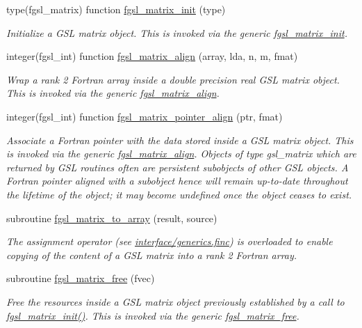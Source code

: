 \begin{DoxyCompactItemize}
type(fgsl\+\_\+matrix) function \hyperlink{array_8finc_af93d762ccde0b58b767c72579cbfb3cb}{fgsl\+\_\+matrix\+\_\+init} (type)
\begin{DoxyCompactList}\small\item\em Initialize a G\+S\+L matrix object. This is invoked via the generic \hyperlink{interfacefgsl__matrix__init}{fgsl\+\_\+matrix\+\_\+init}. \end{DoxyCompactList}\item 
integer(fgsl\+\_\+int) function \hyperlink{array_8finc_ae0c19c4453ce18db5e6415a047c3a59e}{fgsl\+\_\+matrix\+\_\+align} (array, lda, n, m, fmat)
\begin{DoxyCompactList}\small\item\em Wrap a rank 2 Fortran array inside a double precision real G\+S\+L matrix object. This is invoked via the generic \hyperlink{interfacefgsl__matrix__align}{fgsl\+\_\+matrix\+\_\+align}. \end{DoxyCompactList}\item 
integer(fgsl\+\_\+int) function \hyperlink{array_8finc_a54b17f056b272b74ae425a588e4653d5}{fgsl\+\_\+matrix\+\_\+pointer\+\_\+align} (ptr, fmat)
\begin{DoxyCompactList}\small\item\em Associate a Fortran pointer with the data stored inside a G\+S\+L matrix object. This is invoked via the generic \hyperlink{interfacefgsl__matrix__align}{fgsl\+\_\+matrix\+\_\+align}. Objects of type {\ttfamily gsl\+\_\+matrix} which are returned by G\+S\+L routines often are persistent subobjects of other G\+S\+L objects. A Fortran pointer aligned with a subobject hence will remain up-\/to-\/date throughout the lifetime of the object; it may become undefined once the object ceases to exist. \end{DoxyCompactList}\item 
subroutine \hyperlink{array_8finc_a44e06325d8b322997dcf6ab28417dd4f}{fgsl\+\_\+matrix\+\_\+to\+\_\+array} (result, source)
\begin{DoxyCompactList}\small\item\em The assignment operator (see \hyperlink{generics_8finc}{interface/generics.\+finc}) is overloaded to enable copying of the content of a G\+S\+L matrix into a rank 2 Fortran array. \end{DoxyCompactList}\item 
subroutine \hyperlink{array_8finc_a0b551f436f076593a8a828cd266e372d}{fgsl\+\_\+matrix\+\_\+free} (fvec)
\begin{DoxyCompactList}\small\item\em Free the resources inside a G\+S\+L matrix object previously established by a call to \hyperlink{array_8finc_af93d762ccde0b58b767c72579cbfb3cb}{fgsl\+\_\+matrix\+\_\+init()}. This is invoked via the generic \hyperlink{interfacefgsl__matrix__free}{fgsl\+\_\+matrix\+\_\+free}. \end{DoxyCompactList}\item 

\end{DoxyCompactItemize}
